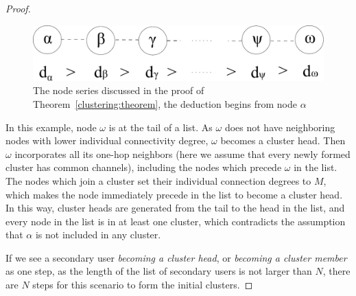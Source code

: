 \documentclass[times]{ettauth}
\theoremstyle{mytheoremstyle}
\theoremstyle{mytheoremstyle}
\theoremstyle{mytheoremstyle}
\begin{document}
\begin{proof}
\begin{figure}[ht!]
  \centering
\includegraphics[width=0.6\linewidth]{lemma1.pdf}
	\caption{The node series discussed in the proof of Theorem~\ref{clustering:theorem}, the deduction begins from node $\alpha$}
	\label{lemma1}
\end{figure}


In this example, node $\omega$ is at the tail of a list.
As $\omega$ does not have neighboring nodes with lower individual connectivity degree, $\omega$ becomes a cluster head.
Then $\omega$ incorporates all its one-hop neighbors (here we assume that every newly formed cluster has common channels), including the nodes which precede $\omega$ in the list.
The nodes which join a cluster set their individual connection degrees to $M$, which makes the node immediately precede in the list to become a cluster head.
In this way, cluster heads are generated from the tail to the head in the list, and every node in the list is in at least one cluster, which contradicts the assumption that $\alpha$ is not included in any cluster.

If we see a secondary user \textit{becoming a cluster head}, or \textit{becoming a cluster member} as one step, as the length of the list of secondary users is not larger than $N$, there are $N$ steps for this scenario to form the initial clusters.

\end{proof}


%
\end{document}
